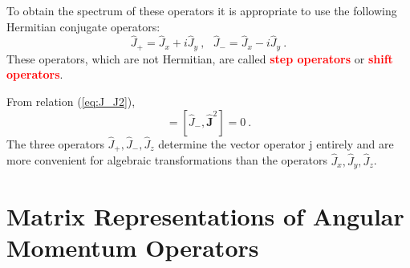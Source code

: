 \documentclass[12pt,a4paper]{article}
\renewcommand{\vec}[1]{\boldsymbol{#1}}
\begin{document}
To obtain the spectrum of these operators it is appropriate to use the following Hermitian conjugate operators:
\begin{equation}
\hat{J}_+ = \hat{J}_x +i \hat{J}_y ~, ~~~ \hat{J}_- = \hat{J}_x -i \hat{J}_y ~.
\end{equation}
These operators, which are not Hermitian, are called \textcolor{red}{\bf step operators} or \textcolor{red}{\bf shift operators}.

From relation (\ref{eq:J_J2}), 
\begin{equation}
[\hat{J}_+ , \vec{\hat{J}}^2] = [\hat{J}_-,  \vec{\hat{J}}^2] = 0 ~.
\end{equation}
The three operators $\hat{J}_+, \hat{J}_-, \hat{J}_z$ determine the vector operator j entirely and are more convenient for algebraic transformations than the operators $\hat{J}_x, \hat{J}_y, \hat{J}_z$.



\section{Matrix Representations of Angular Momentum Operators}
\cite{greiner1994quantum} 









































\end{document}

